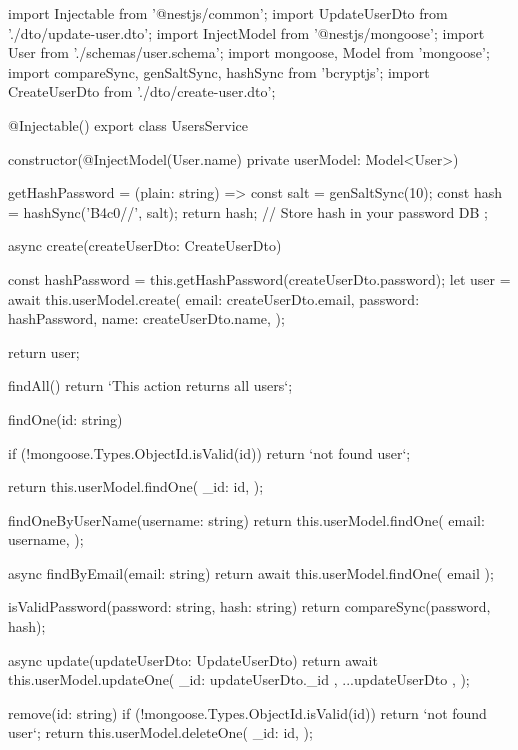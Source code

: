 import { Injectable } from '@nestjs/common';
import { UpdateUserDto } from './dto/update-user.dto';
import { InjectModel } from '@nestjs/mongoose';
import { User } from './schemas/user.schema';
import mongoose, { Model } from 'mongoose';
import { compareSync, genSaltSync, hashSync } from 'bcryptjs';
import { CreateUserDto } from './dto/create-user.dto';

@Injectable()
export class UsersService {
  constructor(@InjectModel(User.name) private userModel: Model<User>) {}

  getHashPassword = (plain: string) => {
    const salt = genSaltSync(10);
    const hash = hashSync('B4c0//', salt);
    return hash;
    // Store hash in your password DB
  };

  async create(createUserDto: CreateUserDto) {
    const hashPassword = this.getHashPassword(createUserDto.password);
    let user = await this.userModel.create({
      email: createUserDto.email,
      password: hashPassword,
      name: createUserDto.name,
    });

    return user;
  }

  findAll() {
    return `This action returns all users`;
  }

  findOne(id: string) {
    if (!mongoose.Types.ObjectId.isValid(id)) {
      return `not found user`;
    }

    return this.userModel.findOne({
      _id: id,
    });
  }

  findOneByUserName(username: string) {
    return this.userModel.findOne({
      email: username,
    });
  }

  async findByEmail(email: string) {
    return await this.userModel.findOne({ email });
  }

  isValidPassword(password: string, hash: string) {
    return compareSync(password, hash);
  }

  async update(updateUserDto: UpdateUserDto) {
    return await this.userModel.updateOne(
      { _id: updateUserDto._id },
      { ...updateUserDto },
    );
  }

  remove(id: string) {
    if (!mongoose.Types.ObjectId.isValid(id)) {
      return `not found user`;
    }
    return this.userModel.deleteOne({
      _id: id,
    });
  }
}
